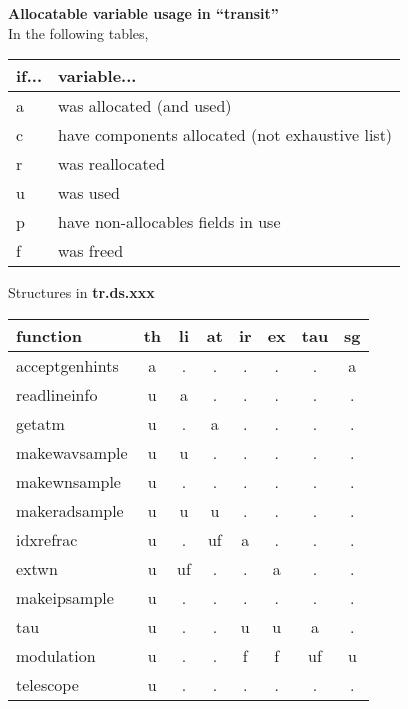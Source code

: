 \documentclass{article}
\begin{document}
\begin{center}
{\large {\bf Allocatable variable usage in ``transit''}}\\[1cm]
In the following tables, \\
\begin{tabular}{ll}
if... & variable...\\
\hline
a & was allocated (and used) \\
c & have components allocated (not exhaustive list) \\
r & was reallocated \\
u & was used \\
p & have non-allocables fields in use \\
f & was freed \\
\end{tabular}
\end{center}

\vspace{1cm}

\begin{center}
{\large Structures in {\bf tr.ds.xxx}}\\[1cm]
\begin{tabular}{l|ccccccc}
function
  & th & li & at & ir & ex & tau & sg \\
\hline 	 	    				 
acceptgenhints			 
  & a  & .  & .  & .  & .  & .   & a  \\
readlineinfo			 
  & u  & a  & .  & .  & .  & .   & .  \\
getatm 	 	    				 
  & u  & .  & a  & .  & .  & .   & .  \\
makewavsample			 
  & u  & u  & .  & .  & .  & .   & .  \\
makewnsample			 
  & u  & .  & .  & .  & .  & .   & .  \\
makeradsample			 
  & u  & u  & u  & .  & .  & .   & .  \\
idxrefrac   			 
  & u  & .  & uf & a  & .  & .   & .  \\
extwn  	 	    				 
  & u  & uf & .  & .  & a  & .   & .  \\
makeipsample			 
  & u  & .  & .  & .  & .  & .   & .  \\
tau    	 	    				 
  & u  & .  & .  & u  & u  & a   & .  \\
modulation  			 
  & u  & .  & .  & f  & f  & uf  & u  \\
telescope   			 
  & u  & .  & .  & .  & .  & .   & .  \\
\hline
\end{tabular}
\end{center}
\end{document}
